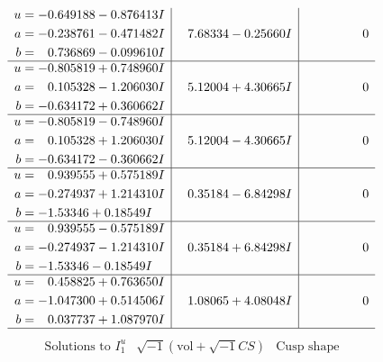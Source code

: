 \documentclass[1p]{elsarticle_modified}
\theoremstyle{definition}
\newcommand{\I}{\sqrt{-1}}
\begin{document}
$$\begin{array}{c|c|c}
\begin{aligned}
u &= -0.649188 - 0.876413 I \\
a &= -0.238761 - 0.471482 I \\
b &= \phantom{-}0.736869 - 0.099610 I\end{aligned}
 & \phantom{-}7.68334 - 0.25660 I & \phantom{-0.000000 } 0 \\ \hline\begin{aligned}
u &= -0.805819 + 0.748960 I \\
a &= \phantom{-}0.105328 - 1.206030 I \\
b &= -0.634172 + 0.360662 I\end{aligned}
 & \phantom{-}5.12004 + 4.30665 I & \phantom{-0.000000 } 0 \\ \hline\begin{aligned}
u &= -0.805819 - 0.748960 I \\
a &= \phantom{-}0.105328 + 1.206030 I \\
b &= -0.634172 - 0.360662 I\end{aligned}
 & \phantom{-}5.12004 - 4.30665 I & \phantom{-0.000000 } 0 \\ \hline\begin{aligned}
u &= \phantom{-}0.939555 + 0.575189 I \\
a &= -0.274937 + 1.214310 I \\
b &= -1.53346 + 0.18549 I\end{aligned}
 & \phantom{-}0.35184 - 6.84298 I & \phantom{-0.000000 } 0 \\ \hline\begin{aligned}
u &= \phantom{-}0.939555 - 0.575189 I \\
a &= -0.274937 - 1.214310 I \\
b &= -1.53346 - 0.18549 I\end{aligned}
 & \phantom{-}0.35184 + 6.84298 I & \phantom{-0.000000 } 0 \\ \hline\begin{aligned}
u &= \phantom{-}0.458825 + 0.763650 I \\
a &= -1.047300 + 0.514506 I \\
b &= \phantom{-}0.037737 + 1.087970 I\end{aligned}
 & \phantom{-}1.08065 + 4.08048 I & \phantom{-0.000000 } 0\\
 \hline 
 \end{array}$$\newpage$$\begin{array}{c|c|c}  
\text{Solutions to }I^u_{1}& \I (\text{vol} + \sqrt{-1}CS) & \text{Cusp shape}\\
 \hline 
\begin{aligned}

\end{aligned}
\end{array}$$
\end{document}
